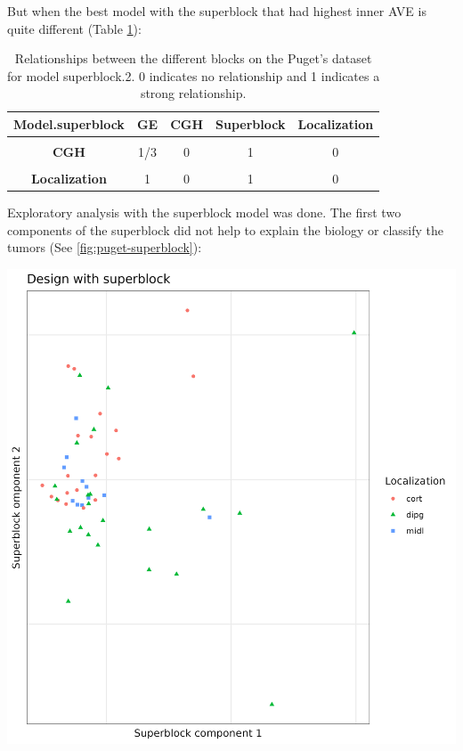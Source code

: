 \documentclass[
  a4paper,
]{book}
\let\origfigure\figure
\let\endorigfigure\endfigure
\renewenvironment{figure}[1][2] {
    \expandafter\origfigure\expandafter[!ht]
} {
    \endorigfigure
}
\begin{document}
But when the best model with the superblock that had highest inner AVE is quite different (Table \ref{tab:puget-model-superblock-2}):

\begin{table}[H]

\caption[Model with superblock.2 for Puget's dataset.]{\label{tab:puget-model-superblock-2}Relationships between the different blocks on the Puget's dataset for model superblock.2. 0 indicates no relationship and 1 indicates a strong relationship.}
\centering
\begin{tabular}[t]{|>{}c|c|c|c|>{}c|}
\hline
\textbf{Model.superblock} & \textbf{GE} & \textbf{CGH} & \textbf{Superblock} & \textbf{Localization}\\
\hline
\textbf{\cellcolor{gray!6}{GE}} & \cellcolor{gray!6}{1} & \cellcolor{gray!6}{1/3} & \cellcolor{gray!6}{0} & \cellcolor{gray!6}{1}\\
\hline
\textbf{CGH} & 1/3 & 0 & 1 & 0\\
\hline
\textbf{\cellcolor{gray!6}{Superblock}} & \cellcolor{gray!6}{0} & \cellcolor{gray!6}{1} & \cellcolor{gray!6}{0} & \cellcolor{gray!6}{0}\\
\hline
\textbf{Localization} & 1 & 0 & 1 & 0\\
\hline
\end{tabular}
\end{table}

Exploratory analysis with the superblock model was done.
The first two components of the superblock did not help to explain the biology or classify the tumors (See \ref{fig:puget-superblock}):

\begin{figure}
\includegraphics[width=1\linewidth]{images/pugets_superblock} \caption[Superblock components on Puget's dataset]{First components of the superblock which has all the data of the samples on the Puget's dataset.}\label{fig:puget-superblock}
\end{figure}
\end{document}
